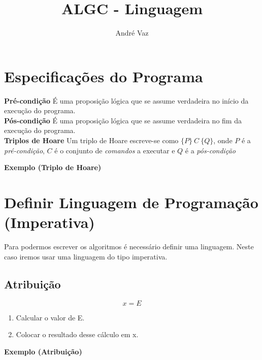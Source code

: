 \documentclass[12pt]{article}
\title{ALGC - Linguagem}
\author{André Vaz}
\begin{document}
    \maketitle

    \section{Especificações do Programa}
        \textbf{Pré-condição}
            É uma proposição lógica que se assume verdadeira
            no início da execução do programa.\\
        \textbf{Pós-condição}
            É uma proposição lógica que se assume verdadeira
            no fim da execução do programa.\\
        \textbf{Triplos de Hoare}
            Um triplo de Hoare escreve-se como $\{P\}\ C\ \{Q\}$, onde
            $P$ é a \textit{pré-condição}, $C$ é o conjunto de \textit{comandos} a executar
            e $Q$ é a \textit{pós-condição}
            \begin{center}\textbf{Exemplo (Triplo de Hoare)}\\ \end{center}

    \section{Definir Linguagem de Programação (Imperativa)}
        Para podermos escrever os algoritmos é necessário definir
        uma linguagem. Neste caso iremos usar uma linguagem do tipo
        imperativa.
        \subsection{Atribuição}
            $$x = E$$
            \begin{enumerate}
                \item Calcular o valor de E.
                \item Colocar o resultado desse cálculo em x.
            \end{enumerate}
            \begin{center}\textbf{Exemplo (Atribuição)}\\ \end{center}
\end{document}
